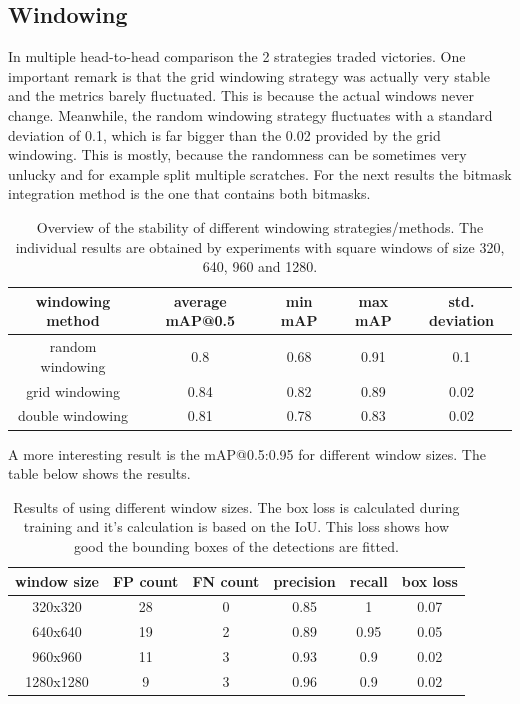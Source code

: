 \subsection*{Windowing}

In multiple head-to-head comparison the 2 strategies traded victories. One important remark is that the grid windowing strategy was actually very stable and the metrics barely fluctuated. This is because the actual windows never change. Meanwhile, the random windowing strategy fluctuates with a standard deviation of 0.1, which is far bigger than the 0.02 provided by the grid windowing. This is mostly, because the randomness can be sometimes very unlucky and for example split multiple scratches. For the next results the bitmask integration method is the one that contains both bitmasks.\\

\begin{table}
\centering
\begin{tabular}{ ||c|c|c|c|c||}
\hline
windowing method & average mAP@0.5 & min mAP & max mAP & std. deviation\\ [0.5ex]
\hline\hline
random windowing & 0.8 & 0.68 & 0.91 & 0.1 \\
grid windowing & 0.84  & 0.82 & 0.89 & 0.02 \\
double windowing & 0.81  & 0.78 & 0.83 & 0.02 \\
\hline
\end{tabular}
\caption{Overview of the stability of different windowing strategies/methods. The individual results are obtained by experiments with square windows of size 320, 640, 960 and 1280.}
\label{impl:win_strategy}
\end{table}

A more interesting result is the mAP@0.5:0.95 for different window sizes. The table below shows the results.


\begin{table}
\centering
\begin{tabular}{ ||c|c|c|c|c|c||}
\hline
window size & FP count & FN count & precision & recall & box loss\\ [0.5ex]
\hline\hline
320x320 & 28 & 0 & 0.85 & 1 & 0.07\\
640x640 & 19 & 2 & 0.89 & 0.95 & 0.05\\
960x960 & 11 & 3 & 0.93 & 0.9 & 0.02\\
1280x1280 & 9 & 3 & 0.96 & 0.9 & 0.02\\
\hline
\end{tabular}
\caption{Results of using different window sizes. The box loss is calculated during training and it's calculation is based on the IoU. This loss shows how good the bounding boxes of the detections are fitted. }
\label{impl:win_size}
\end{table}

